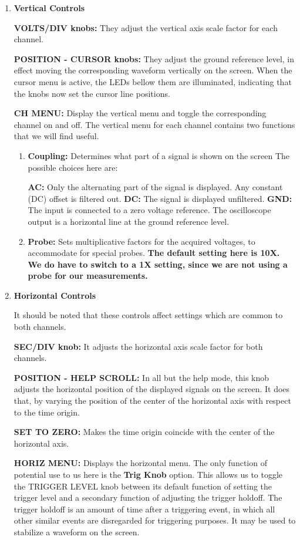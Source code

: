 \begin{enumerate}
\item {\bf Vertical Controls}

{\bf VOLTS/DIV knobs:} They adjust the vertical axis scale factor for each
channel.

{\bf POSITION - CURSOR knobs:} They adjust the ground reference level, in
effect moving the corresponding waveform vertically on the screen. When the
cursor menu is active, the LEDs bellow them are illuminated, indicating that
the knobs now set the cursor line positions.

{\bf CH MENU:} Display the vertical menu and toggle the corresponding
channel on and off. The vertical menu for each channel contains two functions
that we will find useful.

\begin{enumerate}

\item {\bf Coupling:} Determines what part of a signal is shown on the screen
The possible choices here are:

{\bf AC:} Only the alternating part of the signal is displayed. Any constant (DC) offset is filtered out.
{\bf DC:} The signal is displayed unfiltered.
{\bf GND:} The input is connected to a zero voltage reference. The oscilloscope
output is a horizontal line at the ground reference level.

\item {\bf Probe:} Sets multiplicative factors for the acquired voltages, to
accommodate for special probes. {\bf The default setting here is 10X. We do
have to switch to a 1X setting, since we are not using a probe for our
measurements.}

\end{enumerate}

\item {\bf Horizontal Controls}

It should be noted that these controls affect settings which are common to both
channels.

{\bf SEC/DIV knob:} It adjusts the horizontal axis scale factor for both
channels.

{\bf POSITION - HELP SCROLL:} In all but the help mode, this knob adjusts the
horizontal position of the displayed signals on the screen. It does that, by
varying the position of the center of the horizontal axis with respect to the
time origin.

{\bf SET TO ZERO:} Makes the time origin coincide with the center of the
horizontal axis.

{\bf HORIZ MENU:} Displays the horizontal menu. The only function of potential
use to us here is the {\bf Trig Knob} option. This allows us to toggle the
TRIGGER LEVEL knob between its default function of setting the trigger level and
a secondary function of adjusting the trigger holdoff. The trigger holdoff is an
amount of time after a triggering event, in which all other similar events are
disregarded for triggering purposes. It may be used to stabilize a waveform on
the screen.


\end{enumerate}
